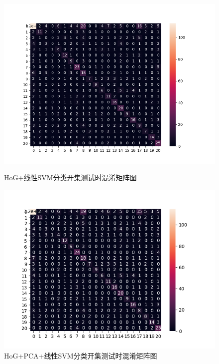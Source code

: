 \documentclass[cn]{elegantbook}
\begin{document}
\begin{figure}[!h]
	\centering
	\begin{minipage}{0.48\linewidth}
		\centering
		\includegraphics[width=\linewidth]{../results/hog_svm_lin_open}
		\caption{\label{hog_svm_lin_open}HoG+线性SVM分类开集测试时混淆矩阵图}
	\end{minipage}
	\begin{minipage}{0.48\linewidth}
		\centering
		\includegraphics[width=\linewidth]{../results/hog_pca_svm_lin_open}
		\caption{\label{hog_pca_svm_lin_open}HoG+PCA+线性SVM分类开集测试时混淆矩阵图}
	\end{minipage}
\end{figure}
\end{document}
